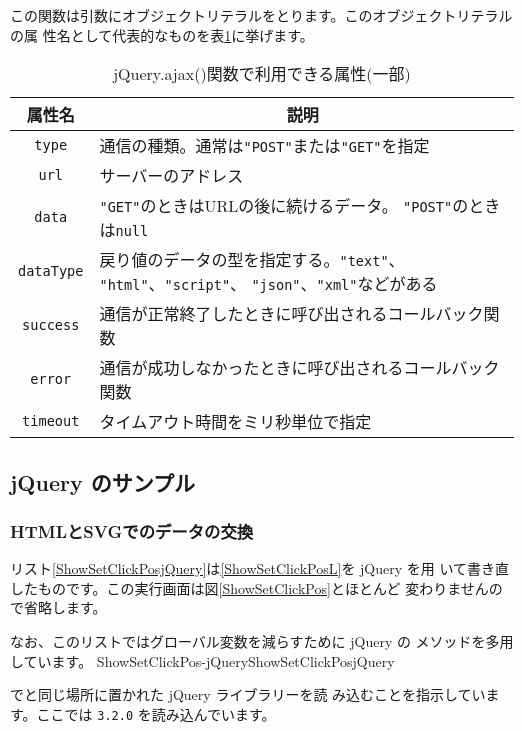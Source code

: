 この関数は引数にオブジェクトリテラルをとります。このオブジェクトリテラルの属
性名として代表的なものを表\ref{jQueryAjax}に挙げます。
\begin{table}[ht]
 \caption{jQuery.ajax()関数で利用できる属性(一部)}\label{jQueryAjax}
\begin{center}
 \begin{tabular}{|c|m{}|}\hline
属性名  &\multicolumn{1}{c|}{説明} \\\hline
  \texttt{type}&通信の種類。通常は\texttt{"POST"}または\texttt{"GET"}を指定\\
  \hline
  \texttt{url}&サーバーのアドレス\\ \hline
  \texttt{data}&\texttt{"GET"}のときはURLの後に続けるデータ。
      \texttt{"POST"}のときは\texttt{null}\\ \hline
  \texttt{dataType}&戻り値のデータの型を指定する。\texttt{"text"}、
      \texttt{"html"}、\texttt{"script"}、      
\texttt{"json"}、\texttt{"xml"}などがある\\ \hline
\texttt{success}&通信が正常終了したときに呼び出されるコールバック関数
      \\ \hline
\texttt{error}&通信が成功しなかったときに呼び出されるコールバック関数
      \\ \hline
  \texttt{timeout}&タイムアウト時間をミリ秒単位で指定\\ \hline
 \end{tabular}
\end{center}
\end{table}
\subsection{jQuery のサンプル}
\renewcommand{\FuncRef}[1]{{機能\ref{#1}}}
\subsubsection{HTMLとSVGでのデータの交換}
リスト\ref{ShowSetClickPosjQuery}は\ref{ShowSetClickPosL}を jQuery を用
いて書き直したものです。この実行画面は図\ref{ShowSetClickPos}とほとんど
変わりませんので省略します。

なお、このリストではグローバル変数を減らすために jQuery の
メソッドを多用しています。
{}%
{ShowSetClickPos-jQuery}{ShowSetClickPosjQuery}

で\HTML と同じ場所に置かれた jQuery ライブラリーを読
			 み込むことを指示しています。ここでは \texttt{3.2.0} を読み込んでいます。

